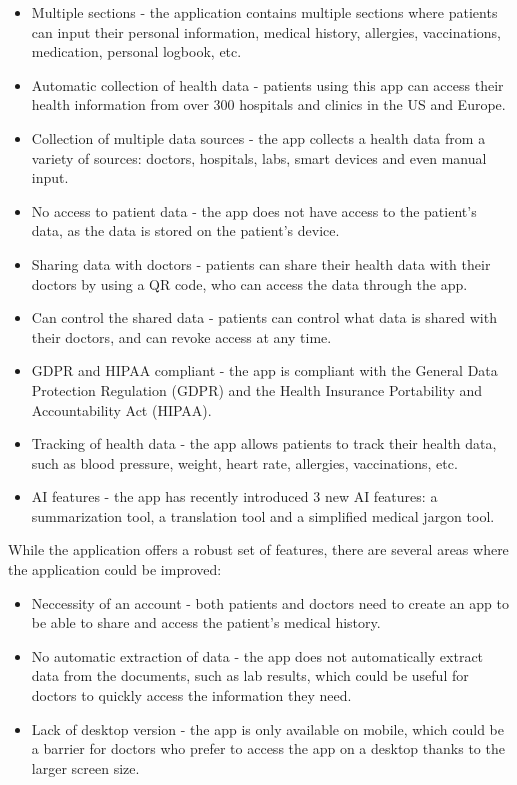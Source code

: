 \begin{itemize}
    \item Multiple sections - the application contains multiple sections where patients can input their personal information, medical history, allergies, vaccinations, medication, personal logbook, etc.
    \item Automatic collection of health data - patients using this app can access their health information from over 300 hospitals and clinics in the US and Europe.
    \item Collection of multiple data sources - the app collects a health data from a variety of sources: doctors, hospitals, labs, smart devices and even manual input.
    \item No access to patient data - the app does not have access to the patient's data, as the data is stored on the patient's device.
    \item Sharing data with doctors - patients can share their health data with their doctors by using a QR code, who can access the data through the app.
    \item Can control the shared data - patients can control what data is shared with their doctors, and can revoke access at any time.
    \item GDPR and HIPAA compliant - the app is compliant with the General Data Protection Regulation (GDPR) and the Health Insurance Portability and Accountability Act (HIPAA).
    \item Tracking of health data - the app allows patients to track their health data, such as blood pressure, weight, heart rate, allergies, vaccinations, etc.
    \item AI features - the app has recently introduced 3 new AI features: a summarization tool, a translation tool and a simplified medical jargon tool.
\end{itemize}

While the application offers a robust set of features, there are several areas where the application could be improved:

\begin{itemize}
    \item Neccessity of an account - both patients and doctors need to create an app to be able to share and access the patient's medical history.
    \item No automatic extraction of data - the app does not automatically extract data from the documents, such as lab results, which could be useful for doctors to quickly access the information they need.
    \item Lack of desktop version - the app is only available on mobile, which could be a barrier for doctors who prefer to access the app on a desktop thanks to the larger screen size.
\end{itemize}
